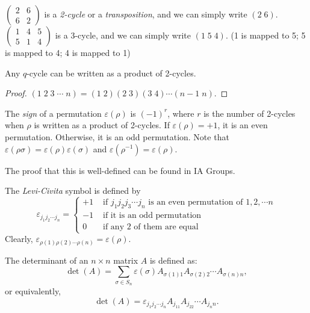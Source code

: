 \documentclass[a4paper]{article}
\begin{document}
\begin{defi}
  $\begin{pmatrix} 2 & 6 \\ 6 & 2\end{pmatrix}$ is a \emph{2-cycle} or a \emph{transposition}, and we can simply write $(2\; 6)$. $\begin{pmatrix}1 & 4 & 5\\5 & 1 & 4\end{pmatrix}$ is a 3-cycle, and we can simply write $(1\; 5\; 4)$. (1 is mapped to 5; 5 is mapped to 4; 4 is mapped to 1)
\end{defi}

\begin{prop}
  Any $q$-cycle can be written as a product of 2-cycles.
\end{prop}

\begin{proof}
  $(1\; 2\; 3\; \cdots \; n) = (1\; 2)(2\; 3)(3\; 4)\cdots (n-1\; n)$.
\end{proof}

\begin{defi}
  The \emph{sign} of a permutation $\varepsilon(\rho)$ is $(-1)^r$, where $r$ is the number of 2-cycles when $\rho$ is written as a product of 2-cycles. If $\varepsilon(\rho) = +1$, it is an even permutation. Otherwise, it is an odd permutation. Note that $\varepsilon(\rho\sigma) = \varepsilon(\rho)\varepsilon(\sigma)$ and $\varepsilon(\rho^{-1}) = \varepsilon(\rho)$.
\end{defi}
The proof that this is well-defined can be found in IA Groups.

\begin{defi}
  The \emph{Levi-Civita} symbol is defined by
  \[
    \varepsilon_{j_1j_2\cdots j_n} = \begin{cases}+1 & \text{ if } j_1j_2j_3\cdots j_n\text{ is an even permutation of }1, 2, \cdots n\\
      -1 & \text{ if it is an odd permutation}\\
      0 & \text{ if any 2 of them are equal}
    \end{cases}
  \]
  Clearly, $\varepsilon_{\rho(1)\rho(2)\cdots \rho(n)} = \varepsilon(\rho)$.
\end{defi}

\begin{defi}[Determinant]
  The determinant of an $n\times n$ matrix $A$ is defined as:
  \[
    \det (A) = \sum_{\sigma\in S_n} \varepsilon(\sigma) A_{\sigma(1)1}A_{\sigma(2)2}\cdots A_{\sigma(n)n},
  \]
  or equivalently,
  \[
    \det(A) = \varepsilon_{j_1j_2\cdots j_n}A_{j_11}A_{j_22}\cdots A_{j_nn}.
  \]
\end{defi}
\end{document}
